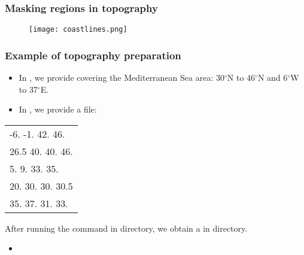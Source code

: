 \begin{frame}
\frametitle{Masking regions in topography}

\begin{figure}
\centering
\texttt{[image: coastlines.png]}
\end{figure}
\end{frame}


\begin{frame}
\frametitle{Example of topography preparation}

\begin{itemize}
\item In , we provide  covering  the Mediterranean Sea area: 30$^{\circ}$N to 46$^{\circ}$N and 6$^{\circ}$W to 37$^{\circ}$E.
\item In , we provide a  file:
\end{itemize}

\begin{table}
\small
\centering
\begin{tabular}{|l|}
\hline
-6. -1. 42. 46.\\
26.5 40. 40. 46.\\
5. 9. 33. 35.\\
20. 30. 30. 30.5\\
35. 37. 31. 33.\\
\hline
\end{tabular}
\end{table}

After running the command  in  directory, we obtain a  in  directory.

\begin{itemize}
\item {}
\end{itemize}

\end{frame}





